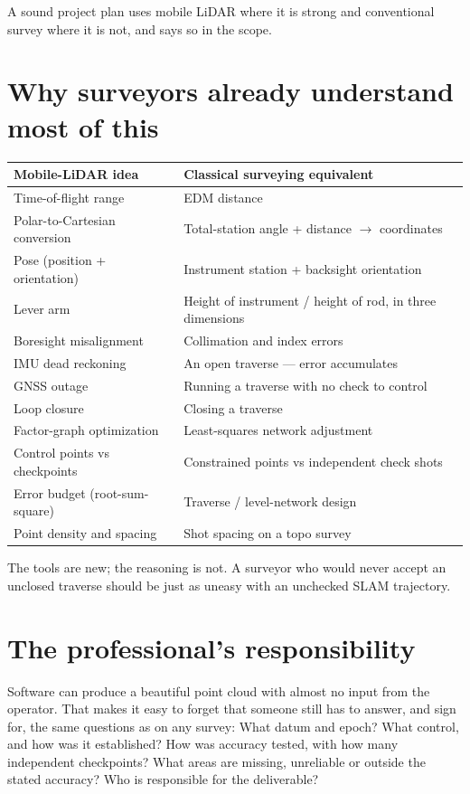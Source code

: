 A sound project plan uses mobile LiDAR where it is strong and conventional survey where it is not, and says so in the scope.

\section{Why surveyors already understand most of this}

\begin{center}\small
\renewcommand{\arraystretch}{1.2}
\begin{tabularx}{\linewidth}{XX}
\toprule
\textbf{Mobile-LiDAR idea} & \textbf{Classical surveying equivalent}\\ \midrule
Time-of-flight range & EDM distance\\
Polar-to-Cartesian conversion & Total-station angle + distance $\to$ coordinates\\
Pose (position + orientation) & Instrument station + backsight orientation\\
Lever arm & Height of instrument / height of rod, in three dimensions\\
Boresight misalignment & Collimation and index errors\\
IMU dead reckoning & An open traverse --- error accumulates\\
GNSS outage & Running a traverse with no check to control\\
Loop closure & Closing a traverse\\
Factor-graph optimization & Least-squares network adjustment\\
Control points vs checkpoints & Constrained points vs independent check shots\\
Error budget (root-sum-square) & Traverse / level-network design\\
Point density and spacing & Shot spacing on a topo survey\\
\bottomrule
\end{tabularx}
\end{center}

The tools are new; the reasoning is not. A surveyor who would never accept an unclosed traverse should be just as uneasy with an unchecked SLAM trajectory.

\section{The professional's responsibility}

Software can produce a beautiful point cloud with almost no input from the operator. That makes it easy to forget that someone still has to answer, and sign for, the same questions as on any survey: What datum and epoch? What control, and how was it established? How was accuracy tested, with how many independent checkpoints? What areas are missing, unreliable or outside the stated accuracy? Who is responsible for the deliverable?

